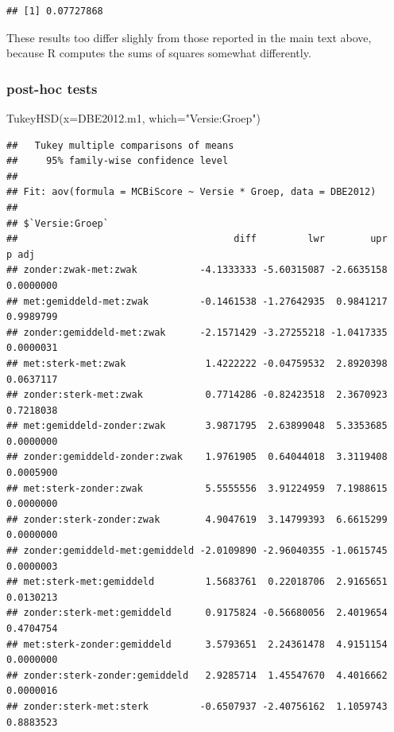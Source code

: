 \documentclass[
]{book}
\newenvironment{Shaded}{\begin{snugshade}}{\end{snugshade}}
\newcommand{\AttributeTok}[1]{\textcolor[rgb]{0.77,0.63,0.00}{#1}}
\newcommand{\FunctionTok}[1]{\textcolor[rgb]{0.00,0.00,0.00}{#1}}
\newcommand{\NormalTok}[1]{#1}
\newcommand{\StringTok}[1]{\textcolor[rgb]{0.31,0.60,0.02}{#1}}
\begin{document}
\begin{verbatim}
## [1] 0.07727868
\end{verbatim}

These results too differ slighly from those reported in the main text above, because R computes the sums of squares somewhat differently.

\hypertarget{post-hoc-tests}{%
\subsubsection{post-hoc tests}\label{post-hoc-tests}}

\begin{Shaded}
\begin{Highlighting}[]
\FunctionTok{TukeyHSD}\NormalTok{(}\AttributeTok{x=}\NormalTok{DBE2012.m1, }\AttributeTok{which=}\StringTok{"Versie:Groep"}\NormalTok{)}
\end{Highlighting}
\end{Shaded}

\begin{verbatim}
##   Tukey multiple comparisons of means
##     95% family-wise confidence level
## 
## Fit: aov(formula = MCBiScore ~ Versie * Groep, data = DBE2012)
## 
## $`Versie:Groep`
##                                      diff         lwr        upr     p adj
## zonder:zwak-met:zwak           -4.1333333 -5.60315087 -2.6635158 0.0000000
## met:gemiddeld-met:zwak         -0.1461538 -1.27642935  0.9841217 0.9989799
## zonder:gemiddeld-met:zwak      -2.1571429 -3.27255218 -1.0417335 0.0000031
## met:sterk-met:zwak              1.4222222 -0.04759532  2.8920398 0.0637117
## zonder:sterk-met:zwak           0.7714286 -0.82423518  2.3670923 0.7218038
## met:gemiddeld-zonder:zwak       3.9871795  2.63899048  5.3353685 0.0000000
## zonder:gemiddeld-zonder:zwak    1.9761905  0.64044018  3.3119408 0.0005900
## met:sterk-zonder:zwak           5.5555556  3.91224959  7.1988615 0.0000000
## zonder:sterk-zonder:zwak        4.9047619  3.14799393  6.6615299 0.0000000
## zonder:gemiddeld-met:gemiddeld -2.0109890 -2.96040355 -1.0615745 0.0000003
## met:sterk-met:gemiddeld         1.5683761  0.22018706  2.9165651 0.0130213
## zonder:sterk-met:gemiddeld      0.9175824 -0.56680056  2.4019654 0.4704754
## met:sterk-zonder:gemiddeld      3.5793651  2.24361478  4.9151154 0.0000000
## zonder:sterk-zonder:gemiddeld   2.9285714  1.45547670  4.4016662 0.0000016
## zonder:sterk-met:sterk         -0.6507937 -2.40756162  1.1059743 0.8883523
\end{verbatim}
\end{document}
